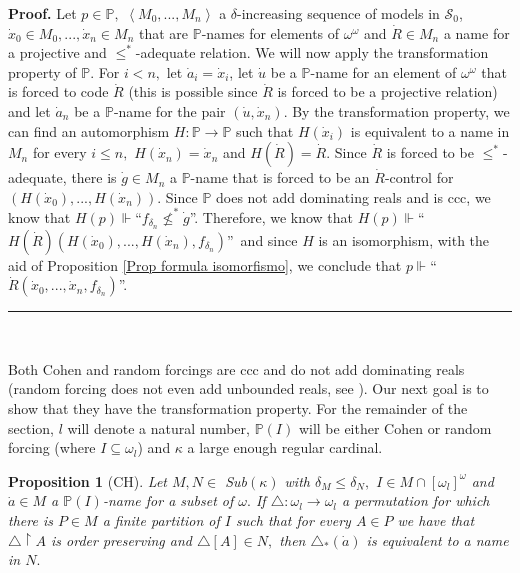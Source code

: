 \documentclass{article}%
\newtheorem{proposition}[theorem]{Proposition}
\newenvironment{proof}[1][Proof]{\noindent\textbf{#1.} }{\ \rule{0.5em}{0.5em}}
\begin{document}
\begin{proof}
Let $p\in\mathbb{P},$ $\left\langle M_{0},...,M_{n}\right\rangle $ a $\delta
$-increasing sequence of models in $\mathcal{S}_{0}$, $\dot{x}_{0}\in
M_{0},...,\dot{x}_{n}\in M_{n}$ that are $\mathbb{P}$-names for elements of
$\omega^{\omega}$ and $\dot{R}\in M_{n}$ a name for a projective and
$\leq^{\ast}$-adequate relation. We will now apply the transformation property
of $\mathbb{P}.$ For $i<n,$ let $\dot{a}_{i}=\dot{x}_{i}$, let $\dot{u}$ be a
$\mathbb{P}$-name for an element of $\omega^{\omega}$ that is forced to code
$\dot{R}$ (this is possible since $\dot{R}$ is forced to be a projective
relation) and let $\dot{a}_{n}$ be a $\mathbb{P}$-name for the pair $(\dot
{u},\dot{x}_{n}).$ By the transformation property, we can find an automorphism
$H:\mathbb{P\longrightarrow P}$ such that $H\left(  \dot{x}_{i}\right)  $ is
equivalent to a name in $M_{n}$ for every $i\leq n,$ $H\left(  \dot{x}%
_{n}\right)  =\dot{x}_{n}$ and $H(\dot{R})=\dot{R}.$ Since $\dot{R}$ is forced
to be $\leq^{\ast}$-adequate, there is $\dot{g}\in M_{n}$ a $\mathbb{P}$-name
that is forced to be an $\dot{R}$-control for $\left(  H\left(  \dot{x}%
_{0}\right)  ,...,H\left(  \dot{x}_{n}\right)  \right)  .$ Since $\mathbb{P}$
does not add dominating reals and is ccc, we know that $H\left(  p\right)
\Vdash$\textquotedblleft$f_{\delta_{n}}\nleq^{\ast}\dot{g}$\textquotedblright.
Therefore, we know that $H\left(  p\right)  \Vdash$\textquotedblleft$H(\dot
{R})\left(  H\left(  \dot{x}_{0}\right)  ,...,H\left(  \dot{x}_{n}\right)
,f_{\delta_{n}}\right)  $\textquotedblright\ and since $H$ is an isomorphism,
with the aid of Proposition \ref{Prop formula isomorfismo}, we conclude that
$p\Vdash$\textquotedblleft$\dot{R}\left(  \dot{x}_{0},...,\dot{x}%
_{n},f_{\delta_{n}}\right)  $\textquotedblright.
\end{proof}

\qquad\ \ \qquad\ \ 

Both Cohen and random forcings are ccc and do not add dominating reals (random
forcing does not even add unbounded reals, see \cite{Barty}). Our next goal is
to show that they have the transformation property. For the remainder of the
section, $l$ will denote a natural number, $\mathbb{P}\left(  I\right)  $ will
be either Cohen or random forcing (where $I\subseteq\omega_{l}$) and $\kappa$
a large enough regular cardinal.

\begin{proposition}
[\textsf{CH}]Let $M,N\in$ \textsf{Sub}$\left(  \kappa\right)  $ with
$\delta_{M}\leq\delta_{N},$ $I\in M\cap\left[  \omega_{l}\right]  ^{\omega}$
and $\dot{a}\in M$ a $\mathbb{P}\left(  I\right)  $-name for a subset of
$\omega.$ If $\triangle:\omega_{l}\longrightarrow\omega_{l}$ a permutation for
which there is $P\in M$ a finite partition of $I$ such that for every $A\in P$
we have that $\triangle\upharpoonright A$ is order preserving and
$\triangle\left[  A\right]  \in N,$ then $\triangle_{\ast}\left(  \dot
{a}\right)  $ is equivalent to a name in $N.$ \label{prop mandar nombres}
\end{proposition}
\end{document}
